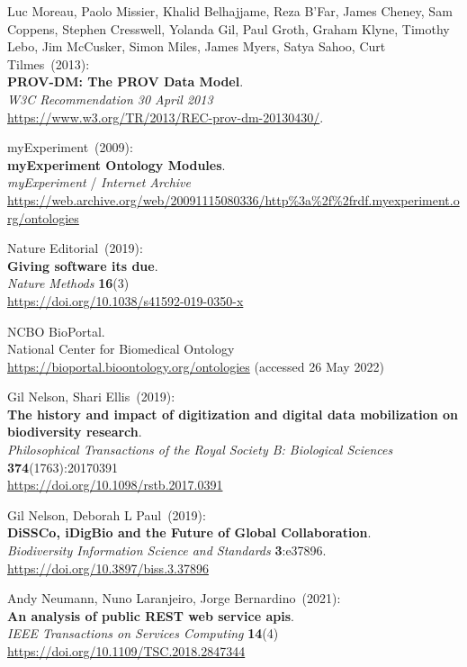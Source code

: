 \begin{thebibliography}{9}
Luc Moreau, Paolo Missier, Khalid Belhajjame, Reza B'Far, James Cheney, Sam Coppens, Stephen Cresswell, Yolanda Gil, Paul Groth, Graham Klyne, Timothy Lebo, Jim McCusker, Simon Miles, James Myers, Satya Sahoo, Curt Tilmes~(2013): \\
\textbf{PROV-DM: The PROV Data Model}. \\
\emph{W3C Recommendation 30 April 2013}\\
\url{https://www.w3.org/TR/2013/REC-prov-dm-20130430/}.

myExperiment~(2009): \\
\textbf{myExperiment Ontology Modules}.\\
\emph{myExperiment} / \emph{Internet Archive}\\
\url{https://web.archive.org/web/20091115080336/http\%3a\%2f\%2frdf.myexperiment.org/ontologies}

Nature Editorial~(2019): \\
\textbf{Giving software its due}.\\
\emph{Nature Methods} \textbf{16}(3)\\
\url{https://doi.org/10.1038/s41592-019-0350-x}

NCBO BioPortal.\\
National Center for Biomedical Ontology \\
\url{https://bioportal.bioontology.org/ontologies} (accessed 26 May 2022)

Gil Nelson, Shari Ellis~(2019): \\
\textbf{The history and impact of digitization and digital data mobilization on biodiversity research}.\\
\emph{Philosophical Transactions of the Royal Society B: Biological Sciences}
\textbf{374}(1763):20170391\\
\url{https://doi.org/10.1098/rstb.2017.0391}

Gil Nelson, Deborah L Paul~(2019): \\
\textbf{DiSSCo, iDigBio and the Future of Global Collaboration}.\\
\emph{Biodiversity Information Science and Standards}
\textbf{3}:e37896.\\
\url{https://doi.org/10.3897/biss.3.37896}

Andy Neumann, Nuno Laranjeiro, Jorge Bernardino~(2021): \\
\textbf{An analysis of public {REST} web service apis}.\\
\emph{IEEE Transactions on Services Computing} \textbf{14}(4)\\
\url{https://doi.org/10.1109/TSC.2018.2847344}


\end{thebibliography}
